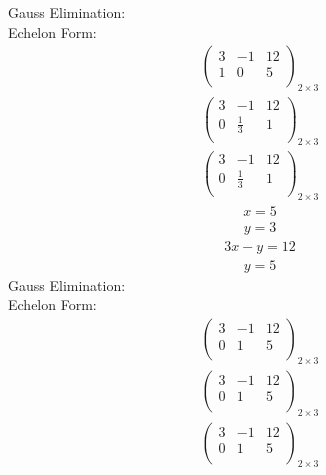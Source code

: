 \documentclass{article}
\begin{document}
Gauss Elimination:\\
Echelon Form:\\
\begin{align*}
\left(
\begin{array}{cc|c}
3 & -1 & 12\\
1 & 0 & 5\\
\end{array}
\right)_{2\times 3}
\end{align*}
\begin{align*}
\left(
\begin{array}{cc|c}
3 & -1 & 12\\
0 & \frac{1}{3} & 1\\
\end{array}
\right)_{2\times 3}
\end{align*}
\begin{align*}
\left(
\begin{array}{cc|c}
3 & -1 & 12\\
0 & \frac{1}{3} & 1\\
\end{array}
\right)_{2\times 3}
\end{align*}
\begin{align*}
x=5\end{align*}
\begin{align*}
y=3\end{align*}
\begin{align*}
3x - y=12\end{align*}
\begin{align*}
y=5\end{align*}
Gauss Elimination:\\
Echelon Form:\\
\begin{align*}
\left(
\begin{array}{cc|c}
3 & -1 & 12\\
0 & 1 & 5\\
\end{array}
\right)_{2\times 3}
\end{align*}
\begin{align*}
\left(
\begin{array}{cc|c}
3 & -1 & 12\\
0 & 1 & 5\\
\end{array}
\right)_{2\times 3}
\end{align*}
\begin{align*}
\left(
\begin{array}{cc|c}
3 & -1 & 12\\
0 & 1 & 5\\
\end{array}
\right)_{2\times 3}
\end{align*}
\end{document}
